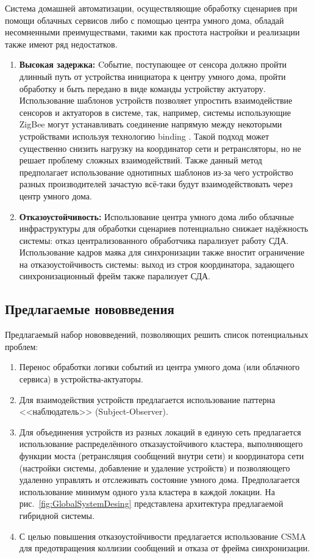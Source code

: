 \documentclass[14pt,a4paper]{extarticle}
\begin{document}
Система домашней автоматизации, осуществляющие обработку сценариев при помощи облачных сервисов либо с помощью центра умного дома, обладай несомненными преимуществами, такими как
простота настройки и реализации также имеют ряд недостатков.
\begin{enumerate}
\item \textbf{Высокая задержка:} Cобытие, поступающее от сенсора должно пройти длинный путь от устройства инициатора к центру умного
дома, пройти обработку и быть передано в виде команды устройству актуатору. Использование шаблонов устройств позволяет упростить взаимодействие сенсоров и актуаторов в системе, так,
например, системы использующие ZigBee могут устанавливать соединение напрямую между некоторыми устройствами используя технологию binding \cite{ZIGBEE_SPEC_R23}. Такой подход может существенно
снизить нагрузку на координатор сети и ретрансляторы, но не решает проблему сложных взаимодействий. Также данный метод предполагает использование однотипных шаблонов из-за чего
устройство разных производителей зачастую всё-таки будут взаимодействовать через центр умного дома.
\item \textbf{Отказоустойчивость:} Использование центра умного дома либо облачные инфраструктуры для обработки сценариев потенциально снижает надёжность системы: отказ
централизованного обработчика парализует работу СДА. Использование кадров маяка для синхронизации также вностит ограничение на отказоустойчивость системы: выход из строя координатора,
задающего синхронизационный фрейм также парализует СДА.
\end{enumerate}

\subsection{Предлагаемые нововведения}

Предлагаемый набор нововведений, позволяющих решить список потенциальных проблем:
\begin{enumerate}
\item Перенос обработки логики событий из центра умного дома (или облачного сервиса) в устройства-актуаторы.
\item Для взаимодействия устройств предлагается использование паттерна <<наблюдатель>> (Subject-Observer).
\item Для объединения устройств из разных локаций в единую сеть предлагается использование распределённого отказаустойчивого кластера, выполняющего
функции моста (ретрансляция сообщений внутри сети) и координатора сети (настройки системы, добавление и удаление устройств) и позволяющего удаленно управлять и отслеживать состояние
умного дома. Предполагается использование минимум одного узла кластера в каждой локации. На рис.~\ref{fig:GlobalSystemDesing} представлена архитектура предлагаемой гибридной системы.
\item С целью повышения отказоустойчивости предлагается использование CSMA \cite{CSMA_article} для предотвращения коллизии сообщений и отказа от фрейма синхронизации.
\end{enumerate}
\end{document}
